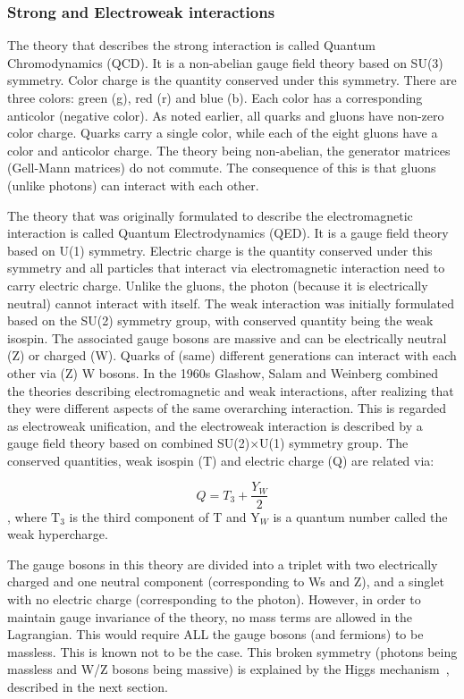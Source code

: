 \subsubsection{Strong and Electroweak interactions}
The theory that describes the strong interaction is called Quantum Chromodynamics (QCD). It is a non-abelian gauge field theory based on SU(3) symmetry. Color charge is the quantity conserved under this symmetry. There are three colors: green (g), red (r) and blue (b). Each color has a corresponding anticolor (negative color). As noted earlier, all quarks and gluons have non-zero color charge. Quarks carry a single color, while each of the eight gluons have a color and anticolor charge. The theory being non-abelian, the generator matrices (Gell-Mann matrices) do not commute. The consequence of this is that gluons (unlike photons) can interact with each other.

The theory that was originally formulated to describe the electromagnetic interaction is called Quantum Electrodynamics (QED). It is a gauge field theory based on U(1) symmetry. Electric charge is the quantity conserved under this symmetry and all particles that interact via electromagnetic interaction need to carry electric charge. Unlike the gluons, the photon (because it is electrically neutral) cannot interact with itself. The weak interaction was initially formulated based on the SU(2) symmetry group, with conserved quantity being the weak isospin. The associated gauge bosons are massive and can be electrically neutral (Z) or charged (W). Quarks of (same) different generations can interact with each other via (Z) W bosons. In the 1960s Glashow, Salam and Weinberg combined the theories describing electromagnetic and weak interactions, after realizing that they were different aspects of the same overarching interaction. This is regarded as electroweak unification, and the electroweak interaction is described by a gauge field theory based on combined SU(2)$\times$U(1) symmetry group. The conserved quantities, weak isospin (T) and electric charge (Q) are related via:

\begin{equation*}
  Q = T_{3} + \frac{Y_{W}}{2}
\end{equation*}
, where $\mathrm{T}_{3}$ is the third component of T and $\mathrm{Y}_{W}$ is a quantum number called the weak hypercharge.

The gauge bosons in this theory are divided into a triplet with two electrically charged and one neutral component (corresponding to Ws and Z), and a singlet with no electric charge (corresponding to the photon). However, in order to maintain gauge invariance of the theory, no mass terms are allowed in the Lagrangian. This would require ALL the gauge bosons (and fermions) to be massless. This is known not to be the case. This broken symmetry (photons being massless and W/Z bosons being massive) is explained by the Higgs mechanism~\cite{Englert:1964et,Higgs:1964ia,Higgs:1964pj,Guralnik:1964eu}, described in the next section.

